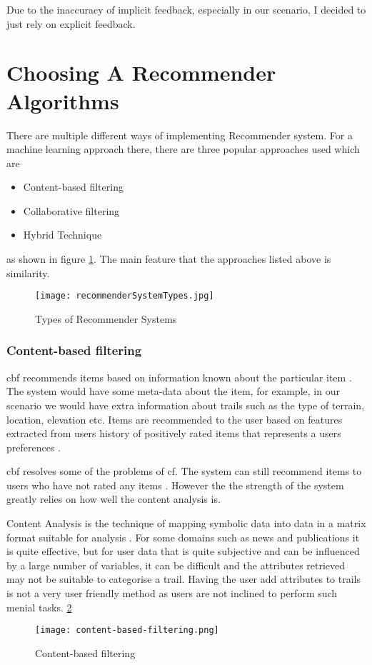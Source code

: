 Due to the inaccuracy of implicit feedback, especially in our scenario, I decided to just rely on explicit feedback.

\section{Choosing A Recommender Algorithms} \label{chooseRecAlg}
There are multiple different ways of implementing Recommender system. For a machine learning approach there, there are three popular approaches used which are
\begin{itemize}
    \item Content-based filtering
    \item Collaborative filtering
    \item Hybrid Technique
\end{itemize}
as shown in figure \ref{fig:recommenderSystemTypes}. The main feature that the approaches listed above is similarity.

\begin{figure}[htb!]
    \centering
    \texttt{[image: recommenderSystemTypes.jpg]}
    \caption{Types of Recommender Systems \cite{isinkaye2015recommendation}}
    \label{fig:recommenderSystemTypes}
\end{figure}

\subsubsection{Content-based filtering}
\acrfull{cbf} recommends items based on information known about the particular item \cite{pazzani2007content}. The system would have some meta-data about the item, for example, in our scenario we would have extra information about trails such as the type of terrain, location, elevation etc. Items are recommended to the user based on features extracted from users history of positively rated items that represents a users preferences \cite{isinkaye2015recommendation}.

\acrshort{cbf} resolves some of the problems of \acrshort{cf}. The system can still recommend items to users who have not rated any items \cite{burke2002hybrid}. However the the strength of the system greatly relies on how well the content analysis is. 

Content Analysis is the technique of mapping symbolic data into data in a matrix format suitable for analysis \cite{roberts2001content}. For some domains such as news and publications it is quite effective, but for user data that is quite subjective and can be influenced by a large number of variables, it can be difficult and the attributes retrieved may not be suitable to categorise a trail. Having the user add attributes to trails is not a very user friendly method as users are not inclined to perform such menial tasks.
 \ref{fig:contentBasedFiltering}
\begin{figure}[htb!]
    \centering
    \texttt{[image: content-based-filtering.png]}
    \caption{Content-based filtering \cite{contentFiltering}}
    \label{fig:contentBasedFiltering}
\end{figure}

